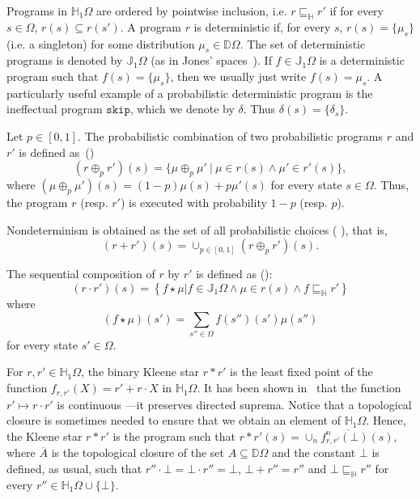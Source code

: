 \documentclass[review]{elsart}
\newcommand{\D}{\mathbb{D}}
\renewcommand{\H}{\mathbb{H}}
\newcommand{\J}{\mathbb{J}}
\newcommand{\pc}[1]{{\oplus_{\!#1}}}
\newcommand{\convol}{\star}
\newcommand{\bks}{*}
\newcommand{\refbyh}{\sqsubseteq_{\mathbb{H}}}
\newcommand{\Defs}[1]{Def. #1}
\begin{document}
Programs in $\H_1 \Omega$ are ordered by pointwise inclusion, i.e. $r\refbyh r'$ if for every $s{\in} \Omega$, $r(s)\subseteq r(s')$. A program $r$ is deterministic if, for every $s$, $r(s) = \{\mu_s\}$ (i.e. a singleton) for some distribution $\mu_s{\in} \D \Omega$. The set of deterministic programs is denoted by $\J_1 \Omega$ (as in Jones' spaces~\cite{Jon92}). If $f{\in}\J_1\Omega$ is a deterministic program such that $f(s) = \{\mu_s\}$, then we usually just write $f(s) = \mu_s$. A particularly useful example of a probabilistic deterministic program is the ineffectual program $\mathtt{skip}$, which we denote by $\delta$. Thus $\delta(s) = \{\delta_s\}$.



Let $p\in[0,1]$. The probabilistic combination of two probabilistic programs $r$ and $r'$ is defined as~(\cite[\Defs{5.4.5}]{Mci04}) 
\begin{equation}\label{def:prog-probabilistic-choice}
(r\pc{p} r')(s) = \{\mu\pc{p}\mu'\ |\ \mu{\in} r(s)\wedge\mu'{\in} r'(s)\},
\end{equation}
where $(\mu \pc{p}\mu')(s) = (1{-}p)\mu(s) {+} p\mu'(s)$ for every state $s{\in}\Omega$. Thus, the program $r$ (resp. $r'$) is executed  with probability $1{-}p$ (resp. $p$).

Nondeterminism is obtained as the set of all probabilistic choices (\cite[\Defs{5.4.6}]{Mci04} ), that is, \begin{equation}\label{def:prog-nondeterminism} (r{+}r')(s) = {\cup}_{p{\in}[0,1]} (r\pc{p}r')(s).  \end{equation}

The sequential composition of $r$ by $r'$ is defined as (\cite[\Defs{5.4.7}]{Mci04}):
\begin{equation}\label{eq:6-sequential-H}
(r{\cdot} r')(s) =  \left\lbrace\left. f{\convol} \mu\right| f{\in}\J_1\Omega\wedge \mu{\in} r(s)\wedge f\refbyh r' \right\rbrace
\end{equation}
where 
\[
	(f{\convol}\mu)(s') = \sum_{s''{\in}\Omega}f(s'')(s')\mu(s'')
\]
for every state $s'{\in}\Omega$. 





For $r,r'{\in}\H_1\Omega$, the binary Kleene star $r{\bks} r'$ is the least fixed point of the function $f_{r,r'}(X) = r' {+} r{\cdot} X$ in $\H_1\Omega$. It has been shown in~\cite{Mci04} that the function $r'\mapsto r{\cdot} r'$ is continuous ---it preserves directed suprema. Notice that a topological closure is sometimes needed to ensure that we obtain an element of $\H_1\Omega$. Hence, the Kleene star $r{\bks} r'$ is the program such that
$r{\bks}r'(s) = \overline{{\cup}_{n}f_{r,r'}^n(\bot)(s)}$,
where $\overline{A}$ is the topological closure of the set $A\subseteq\D\Omega$ and the constant $\bot$ is defined, as usual, such that $r''{\cdot} \bot {=} \bot{\cdot} r'' {=} \bot$, $\bot{+}r'' = r''$ and $\bot\refbyh r''$ for every $r''{\in}\H_1\Omega{\cup}\{\bot\}$.
\end{document}
